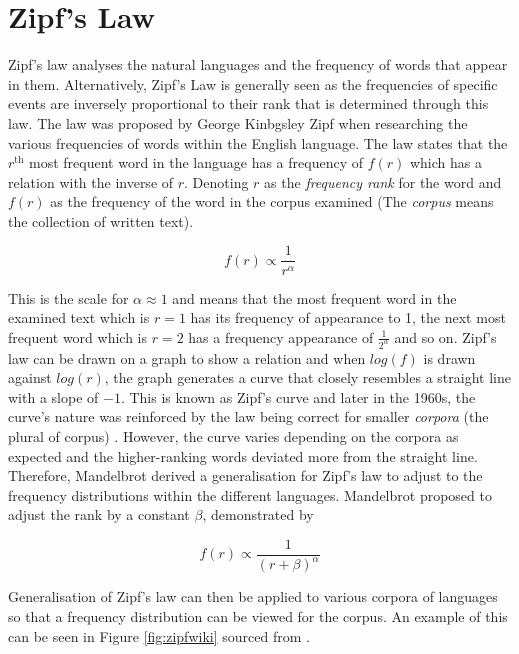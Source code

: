 \section{Zipf's Law}
Zipf's law analyses the natural languages and the frequency of words that appear in them. Alternatively, Zipf's Law \cite{hosch2009zipf} is generally seen as the frequencies of specific events are inversely proportional to their rank that is determined through this law. The law was proposed by George Kinbgsley Zipf when researching the various frequencies of words within the English language. The law states that the $r^{\text{th}}$ most frequent word in the language has a frequency of $f(r)$ which has a relation with the inverse of $r$. Denoting $r$ as the \emph{frequency rank} for the word and $f(r)$ as the frequency of the word in the corpus examined (The \emph{corpus} means the collection of written text).

\begin{equation}\label{eq:zipfs}
f(r) \propto \frac{1}{r^{\alpha}}
\end{equation}

This is the scale for $\alpha \approx 1$ and means that the most frequent word in the examined text which is $r = 1$ has its frequency of appearance to 1, the next most frequent word which is $r = 2$ has a frequency appearance of $\frac{1}{2^{\alpha}}$ and so on. Zipf's law can be drawn on a graph to show a relation and when $log(f)$ is drawn against $log(r)$, the graph generates a curve that closely resembles a straight line with a slope of $-1$. This is known as Zipf's curve and later in the 1960s, the curve's nature was reinforced by the law being correct for smaller \emph{corpora} (the plural of corpus) \cite{sicilia2002extension}. However, the curve varies depending on the corpora as expected and the higher-ranking words deviated more from the straight line. Therefore, Mandelbrot derived a generalisation for Zipf's law to adjust to the frequency distributions within the different languages. Mandelbrot proposed to adjust the rank by a constant $\beta$, demonstrated by

\begin{equation}\label{eq:zipfs}
f(r) \propto \frac{1}{(r + \beta)^{\alpha}}
\end{equation}

Generalisation of Zipf's law can then be applied to various corpora of languages so that a frequency distribution can be viewed for the corpus. An example of this can be seen in Figure \ref{fig:zipfwiki} sourced from \cite{zipffigure}.

